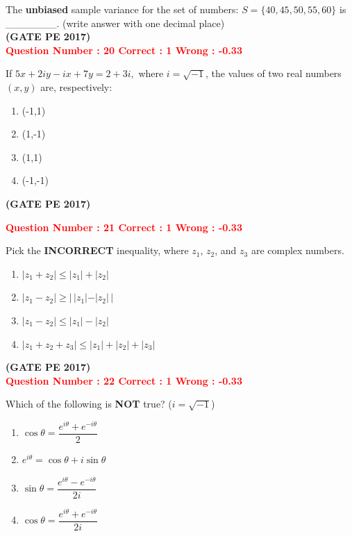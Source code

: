 \documentclass[12pt]{article}
\begin{document}
{The \textbf{unbiased} sample variance for the set of numbers: $S = \{40, 45, 50, 55, 60\}$ is \_\_\_\_\_\_\_. (write answer with one decimal place)\\

\hfill\textbf{(GATE PE 2017)}\\[0.6cm]


\textcolor{red}{\textbf{Question Number : 20 \hfill Correct : 1  Wrong : -0.33}}

If {\LARGE$ 
5x + 2iy - ix + 7y = 2 + 3i,
$ }
where $i = \sqrt{-1}$, the values of two real numbers $(x, y)$ are, respectively:

\begin{enumerate}[label=(\Alph*)]
    \item (-1,1)
    \item (1,-1)
    \item (1,1)
    \item (-1,-1)
\end{enumerate}
\hfill\textbf{(GATE PE 2017)}\\[0.6cm]

\newpage

\textcolor{red}{\textbf{Question Number : 21 \hfill Correct : 1  Wrong : -0.33}}

Pick the \textbf{INCORRECT} inequality, where $z_1$, $z_2$, and $z_3$ are complex numbers.

\begin{enumerate}[label=(\Alph*)]
    \item $|z_1 + z_2| \leq |z_1| + |z_2|$
    \item $|z_1 - z_2| \geq |\,|z_1| - |z_2|\,|$
    \item $|z_1 - z_2| \leq |z_1| - |z_2|$
    \item $|z_1 + z_2 + z_3| \leq |z_1| + |z_2| + |z_3|$
\end{enumerate}

\hfill\textbf{(GATE PE 2017)}\\[0.6cm]

\textcolor{red}{\textbf{Question Number : 22 \hfill Correct : 1  Wrong : -0.33}}

Which of the following is \textbf{NOT} true? \quad ($i = \sqrt{-1}$)

\begin{enumerate}[label=(\Alph*)]
    \item $\cos \theta = \dfrac{e^{i\theta} + e^{-i\theta}}{2}$
    \item $e^{i\theta} = \cos \theta + i \sin \theta$
    \item $\sin \theta = \dfrac{e^{i\theta} - e^{-i\theta}}{2i}$
    \item $\cos \theta = \dfrac{e^{i\theta} + e^{-i\theta}}{2i}$
\end{enumerate}

}
\end{document}
